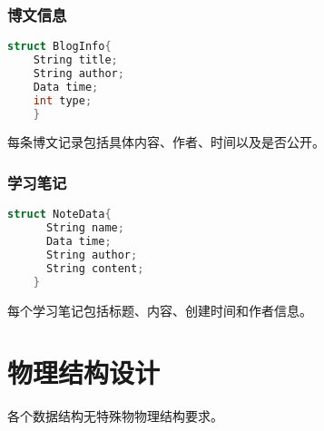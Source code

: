   \subsubsection{博文信息}
  \begin{lstlisting}[language=C,caption=博文信息]
    struct BlogInfo{
    String title;
    String author;
    Data time;
    int type;
    }
  \end{lstlisting}
  每条博文记录包括具体内容、作者、时间以及是否公开。
  \subsubsection{学习笔记}
  \begin{lstlisting}[language=C,caption=学习笔记]
    struct NoteData{
      String name;
      Data time;
      String author;
      String content;
    }
  \end{lstlisting}
  每个学习笔记包括标题、内容、创建时间和作者信息。

\section{物理结构设计}
各个数据结构无特殊物物理结构要求。

